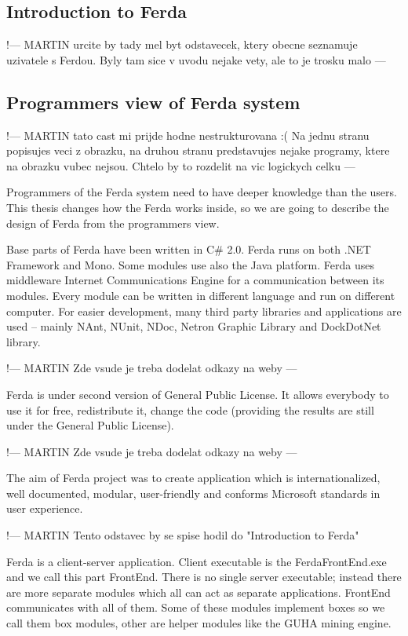 \documentclass[a4paper,12pt]{book}
\begin{document}
\subsection{Introduction to Ferda}
!--- MARTIN urcite by tady mel byt odstavecek, ktery obecne seznamuje uzivatele s Ferdou. Byly tam sice v uvodu nejake vety, ale to je trosku malo ---

\subsection{Programmers view of Ferda system}
!--- MARTIN tato cast mi prijde hodne nestrukturovana :( Na jednu stranu popisujes veci z obrazku, na druhou stranu predstavujes nejake programy, ktere na obrazku vubec nejsou. Chtelo by to rozdelit na vic logickych celku ---

Programmers of the Ferda system need to have deeper knowledge than the users. This thesis changes how the Ferda works inside, so we are going to describe the design of Ferda from the programmers view.

Base parts of Ferda have been written in C\# 2.0. Ferda runs on both .NET Framework and Mono. Some modules use also the Java platform. Ferda uses middleware Internet Communications Engine for a communication between its modules. Every module can be written in different language and run on different computer. For easier development, many third party libraries and applications are used -- mainly NAnt, NUnit, NDoc, Netron Graphic Library and DockDotNet library.

!--- MARTIN Zde vsude je treba dodelat odkazy na weby --- 

Ferda is under second version of General Public License. It allows everybody to use it for free, redistribute it, change the code (providing the results are still under the General Public License).

!--- MARTIN Zde vsude je treba dodelat odkazy na weby ---

The aim of Ferda project was to create application which is internationalized, well documented, modular, user-friendly and conforms Microsoft standards in user experience.

!--- MARTIN Tento odstavec by se spise hodil do "Introduction to Ferda"

Ferda is a client-server application. Client executable is the FerdaFrontEnd.exe and we call this part FrontEnd. There is no single server executable; instead there are more separate modules which all can act as separate applications. FrontEnd communicates with all of them. Some of these modules implement boxes so we call them box modules, other are helper modules like the GUHA mining engine.
\end{document}
